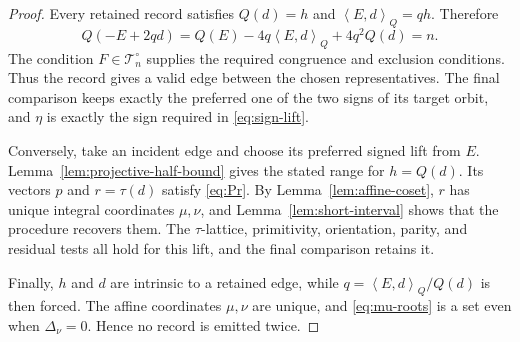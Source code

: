 \documentclass[11pt]{amsart}
\theoremstyle{definition}
\theoremstyle{remark}
\newcommand{\Tres}{\mathcal T_n^{\circ}}
\newcommand{\Qip}[2]{\left\langle #1,#2\right\rangle_Q}
\begin{document}
\begin{proof}
Every retained record satisfies $Q(d)=h$ and $\Qip{E}{d}=qh$.  Therefore
\[
 Q(-E+2qd)=Q(E)-4q\Qip{E}{d}+4q^2Q(d)=n.
\]
The condition $F\in\Tres$ supplies the required congruence and exclusion
conditions.  Thus the record gives a valid edge between the chosen
representatives.  The final
comparison keeps exactly the preferred one of the two signs of its target
orbit, and $\eta$ is exactly the sign required in \eqref{eq:sign-lift}.

Conversely, take an incident edge and choose its preferred signed lift from
$E$.  Lemma~\ref{lem:projective-half-bound} gives the stated range for
$h=Q(d)$.  Its vectors $p$ and $r=\tau(d)$ satisfy \eqref{eq:Pr}.  By
Lemma~\ref{lem:affine-coset}, $r$ has unique integral coordinates $\mu,\nu$, and
Lemma~\ref{lem:short-interval} shows that the procedure recovers them.  The
$\tau$-lattice, primitivity, orientation, parity, and residual tests all hold
for this lift, and the final comparison retains it.

Finally, $h$ and $d$ are intrinsic to a retained edge, while
$q=\Qip{E}{d}/Q(d)$ is then forced.  The affine coordinates $\mu,\nu$ are
unique, and \eqref{eq:mu-roots} is a set even when $\Delta_\nu=0$.  Hence no record is emitted
twice.
\end{proof}
\end{document}
